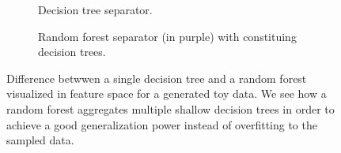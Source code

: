                 \begin{figure}
                    \centering
                    \begin{subfigure}{.48\textwidth}
                        
                        \caption{
                            \label{fig::decision_tree_circles} Decision tree separator.
                        }
                    \end{subfigure}
                    \begin{subfigure}{.48\textwidth}
                        
                        \caption{
                            \label{fig::rf_circles} Random forest separator (in purple) with constituing decision trees.
                        }
                    \end{subfigure}
                    \caption{
                        \label{fig::decision_tree_vs_rf} Difference betwwen a single decision tree and a random forest visualized in feature space for a generated toy data.
                        We see how a random forest aggregates multiple shallow decision trees in order to achieve a good generalization power instead of overfitting to the sampled data.
                    }
                \end{figure}

